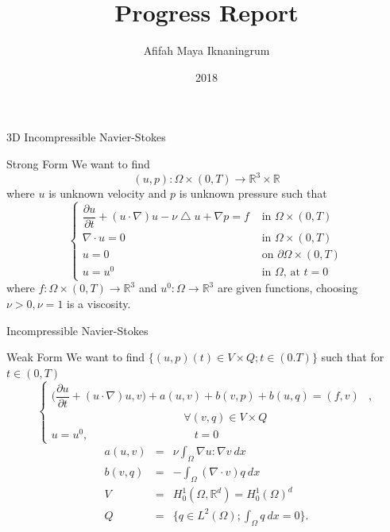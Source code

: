 \documentclass{beamer}
\newcommand{\R}{\mathbb{R}}
\begin{document}
\title{Progress Report}
\author{Afifah Maya Iknaningrum}
\date{2018}

\begin{frame}
\titlepage
\end{frame}

\begin{frame}{3D Incompressible Navier-Stokes}
\begin{block}{Strong Form}
	We want to find \[(u,p) : \Omega \times (0,T) \rightarrow \R^3 \times \R\] where $ u $ is unknown velocity and $ p $ is unknown pressure such that
	\begin{equation}\label{Navier-Stokes}
	\begin{cases}
	\dfrac{\partial u}{\partial t} + (u \cdot \nabla) u - \nu \bigtriangleup u + \nabla p = f & \text{ in } \Omega \times (0,T)\\
	\nabla \cdot u = 0 & \text{ in } \Omega \times (0,T)\\
	u = 0 & \text{ on } \partial \Omega \times (0,T)\\
	u = u^0 & \text{ in } \Omega \text{, at } t=0
	\end{cases}
	\end{equation}
	where $ f : \Omega \times (0,T) \rightarrow \R^3 $ and $ u^0 : \Omega \rightarrow \R^3 $ are given functions, choosing $ \nu > 0 , \nu = 1$ is a viscosity.
\end{block}
\end{frame}

\begin{frame}{Incompressible Navier-Stokes}
\begin{block}{Weak Form}
	We want to find $ \{ (u,p)(t) \in V \times Q ; t \in (0.T) \} $ such that for $ t \in (0,T) $
	\begin{equation} \label{NS_Weak} \nonumber
	\begin{cases}
	\big( \dfrac{\partial u}{\partial t} + (u \cdot \nabla)u,v \big) + a(u,v) + b(v,p) + b(u,q) = (f,v) & , \\ \hspace{5cm} \forall(v,q)\in V\times Q \\ u=u^{0} , \hspace{4cm} t=0
	\end{cases}
	\end{equation}
	\begin{eqnarray}\nonumber
	a(u,v) &=& \nu \int_{\Omega} \nabla u : \nabla v \ dx \\ \nonumber
	b(v,q) &=& - \int_{\Omega} (\nabla \cdot v) q \ dx \\ \nonumber
	V &=& H_{0}^{1}(\Omega, \R^d) = H_{0}^{1}(\Omega)^d \\ \nonumber
	Q &=& \{ q\in L^2(\Omega) ; \int_{\Omega} q \ dx=0 \}.
	\end{eqnarray}
\end{block}
\end{frame}
\end{document}
